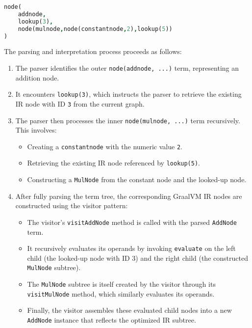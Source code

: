 \begin{lstlisting}[language=Prolog]
node(
    addnode,
    lookup(3),
    node(mulnode,node(constantnode,2),lookup(5))
)
\end{lstlisting}

\newpage
The parsing and interpretation process proceeds as follows:

\begin{enumerate}
    \item The parser identifies the outer \texttt{node(addnode, ...)} term, representing an addition node.
    \item It encounters \texttt{lookup(3)}, which instructs the parser to retrieve the existing IR node with ID \texttt{3} from the current graph.
    \item The parser then processes the inner \texttt{node(mulnode, ...)} term recursively. This involves:
    \begin{itemize}
        \item Creating a \texttt{constantnode} with the numeric value \texttt{2}.
        \item Retrieving the existing IR node referenced by \texttt{lookup(5)}.
        \item Constructing a \texttt{MulNode} from the constant node and the looked-up node.
    \end{itemize}
    \item After fully parsing the term tree, the corresponding GraalVM IR nodes are constructed using the visitor pattern:
    \begin{itemize}
        \item The visitor’s \texttt{visitAddNode} method is called with the parsed \texttt{AddNode} term.
        \item It recursively evaluates its operands by invoking \texttt{evaluate} on the left child (the looked-up node with ID 3) and the right child (the constructed \texttt{MulNode} subtree).
        \item The \texttt{MulNode} subtree is itself created by the visitor through its \texttt{visitMulNode} method, which similarly evaluates its operands.
        \item Finally, the visitor assembles these evaluated child nodes into a new \texttt{AddNode} instance that reflects the optimized IR subtree.
    \end{itemize}
\end{enumerate}
